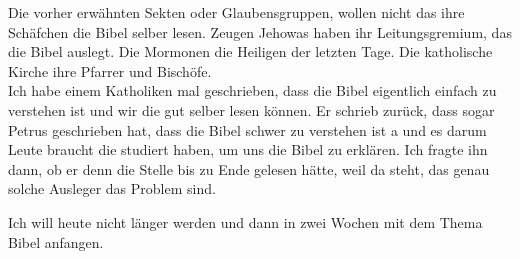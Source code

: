Die vorher erwähnten Sekten oder Glaubensgruppen, wollen nicht das ihre Schäfchen die Bibel selber lesen. Zeugen Jehowas haben ihr Leitungsgremium, das die Bibel auslegt. Die Mormonen die Heiligen der letzten Tage. Die katholische Kirche ihre Pfarrer und Bischöfe.\\
Ich habe einem Katholiken mal geschrieben, dass die Bibel eigentlich einfach zu verstehen ist und wir die gut selber lesen können. Er schrieb zurück, dass sogar Petrus geschrieben hat, dass die Bibel schwer zu verstehen ist a und es darum Leute braucht die studiert haben, um uns die Bibel zu erklären. Ich fragte ihn dann, ob er denn die Stelle bis zu Ende gelesen hätte, weil da steht, das genau solche Ausleger das Problem sind.

Ich will heute nicht länger werden und dann in zwei Wochen mit dem Thema Bibel anfangen.